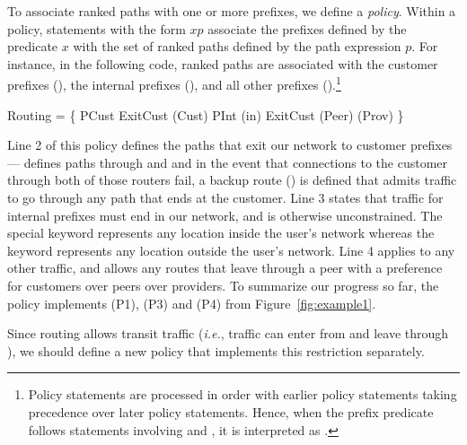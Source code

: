 
To associate ranked paths with
one or more prefixes, we define a \sysname \emph{policy}.
Within a policy, statements with the form $x$\Path$p$
associate the prefixes defined by the predicate $x$ with the set of
ranked paths defined by the path expression $p$.
For instance, in the following code, ranked paths are associated with
the customer prefixes (), the internal prefixes (),
and all other prefixes ().\footnote{Policy statements are processed in
order with earlier policy statements taking precedence over later
policy statements.  Hence, when the prefix predicate \True follows
statements involving  and , it is interpreted as
.}


\begin{code}
\Define Routing = \{
     PCust \Path ExitCust \Prefer \End(Cust)
     PInt  \Path \End(in)
     \True  \Path ExitCust \Prefer \Exit(Peer) \Prefer \Exit(Prov)
\}
\end{code}
\noindent
Line 2 of this policy 
defines the paths that exit our network to customer prefixes--- defines paths through  and  and in the event
that connections to the customer through both of those routers fail,
a backup route () is defined that admits traffic to go through
any path that ends at the customer.
Line 3 states that traffic for internal prefixes must end in our network, and is otherwise unconstrained.  The special keyword \In{} represents any location
inside the user's network whereas the keyword \Out{} represents any location
outside the user's network.
Line 4 applies to any other traffic, and allows any routes that leave through a peer with a preference for customers over peers over providers. To summarize our progress so far, the  policy
implements (P1), (P3) and (P4) from Figure~\ref{fig:example1}.

Since routing allows transit traffic (\emph{i.e.}, traffic can enter from
 and leave through ), we should define a new policy that
implements this restriction separately.


